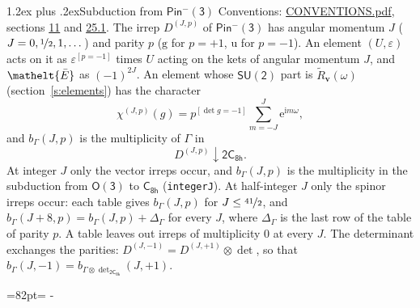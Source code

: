 \documentclass[10pt,a4paper]{article}
\makeatletter
\renewcommand\section{\@startsection{section}{1}{\z@}{-3ex plus -1ex minus -.2ex}%
  {1.2ex plus .2ex}{\normalfont\large\sffamily\bfseries\color{parttitle}}}
\newcommand{\needspace}[1]{\par\penalty-100\begingroup\dimen0=#1\relax\dimen2=\pagegoal
  \advance\dimen2-\pagetotal\ifdim\dimen0>\dimen2\relax\ifdim\dimen2>0pt\vfil\break\fi\fi
  \endgroup}
\numberwithin{equation}{section}
\newcommand{\eltfont}[1]{{\let\sigma\eltsigma\mathelt{#1}}}
\newcommand{\grp}[1]{\mathsf{#1}}
\newcommand{\elt}[1]{\eltfont{#1}}
\newcommand{\ptag}[1]{\mathrm{#1}}
\newcommand{\iverson}[1]{[#1]}
\newcommand{\restr}[2]{#1\!\downarrow#2}
\newcommand{\vv}{\mathbf{v}}
\newcommand{\iunit}{\mathrm{i}}
\newcommand{\expe}{\mathrm{e}}
\newcommand{\irrJp}[2]{D^{(#1,#2)}}
\newcommand{\irrprod}{\otimes}
\newcommand{\barred}[1]{\bar{#1}}
\newcommand{\lift}[1]{\tilde{#1}}
\makeatother
\begin{document}
\section{Subduction from \texorpdfstring{$\grp{Pin^{-}(3)}$}{Pin(3)}}\label{s:subduction_parent}
Conventions: \href{../../CONVENTIONS.pdf}{CONVENTIONS.pdf}, sections \href{../../../rotation/CONVENTIONS.pdf\#conv.11}{11} and \href{../../CONVENTIONS.pdf\#conv.25.1}{25.1}.
\leavevmode\label{n:index.J}\label{n:index.parity}\label{n:irrep.o3}The irrep $\irrJp{J}{p}$ of \href{Pinminus3.pdf}{$\grp{Pin^{-}(3)}$} has angular momentum $J$ ($J = 0, \nicefrac{1}{2}, 1, \dots$) and parity $p$ ($\ptag{g}$ for $p = +1$, $\ptag{u}$ for $p = -1$). An element $(U, \varepsilon)$ acts on it as $\varepsilon^{[p = -1]}$ times $U$ acting on the kets of angular momentum $J$, and $\elt{\barred{E}}$ as $(-1)^{2J}$. \label{n:function.character.parent}\label{n:function.multiplicity}An element whose $\grp{SU(2)}$ part is $\lift{R}_{\vv}(\omega)$ (section~\ref{s:elements}) has the character
\begin{equation}\label{e:chi}\chi^{(J,p)}(g) = p^{\iverson{\det g = -1}}\sum_{m=-J}^{J} \expe^{\iunit m\omega},\end{equation}
and $b_\Gamma(J, p)$ is the multiplicity of $\Gamma$ in
\begin{equation}\label{e:parent}\restr{\irrJp{J}{p}}{\grp{2C_{8h}}}.\end{equation}
At integer $J$ only the vector irreps occur, and $b_\Gamma(J, p)$ is the multiplicity in the subduction from $\grp{O(3)}$ to \href{../../../rotation/data/pdf/C8h.pdf}{$\grp{C_{8h}}$} (\texttt{integerJ}). \label{n:index.increment}At half-integer $J$ only the spinor irreps occur: each table gives $b_\Gamma(J, p)$ for $J \le \nicefrac{41}{2}$, and $b_\Gamma(J + 8, p) = b_\Gamma(J, p) + \Delta_\Gamma$ for every $J$, where $\Delta_\Gamma$ is the last row of the table of parity $p$. A table leaves out irreps of multiplicity 0 at every $J$.
\leavevmode\label{n:operator.determinant.character}The determinant exchanges the parities: $\irrJp{J}{-1} = \irrJp{J}{+1} \irrprod \det$, so that $b_\Gamma(J, -1) = b_{\Gamma \irrprod \det_{\grp{2C_{8h}}}}(J, +1)$.
\needspace{82pt}
\end{document}
